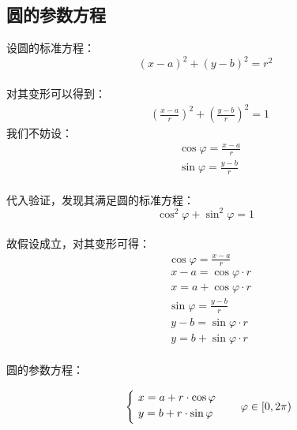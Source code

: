 \documentclass[UTF8]{ctexart}
\begin{document}
\subsection{圆的参数方程}
    设圆的标准方程：
    \setcounter{equation}{0}
    \begin{equation}
        (x-a)^2+(y-b)^2=r^2
    \end{equation}\\
    对其变形可以得到：
    \begin{align}
        &\left(\frac{x-a}{r}\right)^2+\left(\frac{y-b}{r}\right)^2=1
    \end{align}
    我们不妨设：
    \begin{align}
        &\cos{\varphi}=\frac{x-a}{r}\\[4mm]
        &\sin{\varphi}=\frac{y-b}{r}
    \end{align}\\
    代入验证，发现其满足圆的标准方程：
    \begin{equation}
        \cos^2{\varphi}+\sin^2{\varphi}=1
    \end{equation}\\
    故假设成立，对其变形可得：
    \begin{align}
        &\cos{\varphi}=\frac{x-a}{r}\\[3mm]
        &~x-a=\cos{\varphi}\cdot r\\[3mm]
        &~x=a+\cos{\varphi}\cdot r\\[5mm]
        &\sin{\varphi}=\frac{y-b}{r}\\[3mm]
        &~y-b=\sin{\varphi}\cdot r\\[3mm]
        &~y=b+\sin{\varphi}\cdot r
    \end{align}\\
    圆的参数方程：
    \begin{large}
        \begin{equation*}
            ~~~~\begin{cases}
                ~x=a+r\cdot\cos{\varphi}\\
                ~y=b+r\cdot\sin{\varphi}\vspace{3pt}
            \end{cases}\quad\varphi\in[0,2\pi)~~
        \end{equation*}
    \end{large}\\
    
\newpage
\end{document}
